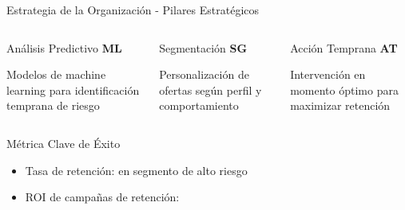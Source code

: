 \begin{frame}{Estrategia de la Organización - Pilares Estratégicos}
    \begin{columns}
        \begin{block}{Análisis Predictivo}
            \centering
            \large \textbf{ML}
            
            Modelos de machine learning para identificación temprana de riesgo
        \end{block}
        
        \begin{block}{Segmentación}
            \centering
            \large \textbf{SG}
            
            Personalización de ofertas según perfil y comportamiento
        \end{block}
        
        \begin{block}{Acción Temprana}
            \centering
            \large \textbf{AT}
            
            Intervención en momento óptimo para maximizar retención
        \end{block}
    \end{columns}
    
    \vsp
    \begin{metricblock}{Métrica Clave de Éxito}
        \begin{itemize}
            \item Tasa de retención:  en segmento de alto riesgo
            \item ROI de campañas de retención: 
        \end{itemize}
    \end{metricblock}
\end{frame}